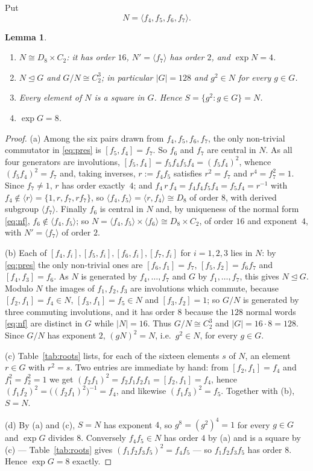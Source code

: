 \documentclass[11pt]{amsart}
\newtheorem{lemma}[theorem]{Lemma}
\theoremstyle{remark}
\begin{document}
Put
\[
 N=\langle f_4,f_5,f_6,f_7\rangle .
\]

\begin{lemma}\label{lem:structure}
\begin{enumerate}
\item[(a)] $N\cong D_8\times C_2$: it has order $16$, $N'=\langle f_7\rangle$ has order
      $2$, and $\exp N=4$.
\item[(b)] $N\trianglelefteq G$ and $G/N\cong C_2^3$; in particular $|G|=128$ and
      $g^2\in N$ for every $g\in G$.
\item[(c)] Every element of $N$ is a square in $G$. Hence $S=\{g^2:g\in G\}=N$.
\item[(d)] $\exp G=8$.
\end{enumerate}
\end{lemma}

\begin{proof}
(a) Among the six pairs drawn from $f_4,f_5,f_6,f_7$, the only non-trivial commutator in
\eqref{eq:pres} is $[f_5,f_4]=f_7$. So $f_6$ and $f_7$ are central in $N$. As all four
generators are involutions, $[f_5,f_4]=f_5f_4f_5f_4=(f_5f_4)^2$, whence $(f_5f_4)^2=f_7$
and, taking inverses, $r:=f_4f_5$ satisfies $r^2=f_7$ and $r^4=f_7^2=1$. Since $f_7\ne1$,
$r$ has order exactly~$4$; and $f_4\,r\,f_4=f_4f_4f_5f_4=f_5f_4=r^{-1}$ with $f_4\notin
\langle r\rangle=\{1,r,f_7,rf_7\}$, so $\langle f_4,f_5\rangle=\langle r,f_4\rangle\cong
D_8$ of order $8$, with derived subgroup $\langle f_7\rangle$. Finally $f_6$ is central in
$N$ and, by uniqueness of the normal form \eqref{eq:nf}, $f_6\notin\langle f_4,f_5\rangle$;
so $N=\langle f_4,f_5\rangle\times\langle f_6\rangle\cong D_8\times C_2$, of order $16$ and
exponent~$4$, with $N'=\langle f_7\rangle$ of order $2$.

(b) Each of $[f_4,f_i],[f_5,f_i],[f_6,f_i],[f_7,f_i]$ for $i=1,2,3$ lies in $N$: by
\eqref{eq:pres} the only non-trivial ones are $[f_6,f_1]=f_7$, $[f_5,f_2]=f_6f_7$ and
$[f_4,f_3]=f_6$. As $N$ is generated by $f_4,\dots,f_7$ and $G$ by $f_1,\dots,f_7$, this
gives $N\trianglelefteq G$. Modulo $N$ the images of $f_1,f_2,f_3$ are involutions which
commute, because $[f_2,f_1]=f_4\in N$, $[f_3,f_1]=f_5\in N$ and $[f_3,f_2]=1$; so $G/N$ is
generated by three commuting involutions, and it has order $8$ because the $128$ normal
words \eqref{eq:nf} are distinct in $G$ while $|N|=16$. Thus $G/N\cong C_2^3$ and
$|G|=16\cdot8=128$. Since $G/N$ has exponent $2$, $(gN)^2=N$, i.e.\ $g^2\in N$, for every
$g\in G$.

(c) Table~\ref{tab:roots} lists, for each of the sixteen elements $s$ of $N$, an element
$r\in G$ with $r^2=s$. Two entries are immediate by hand: from $[f_2,f_1]=f_4$ and
$f_1^2=f_2^2=1$ we get $(f_2f_1)^2=f_2f_1f_2f_1=[f_2,f_1]=f_4$, hence
$(f_1f_2)^2=\bigl((f_2f_1)^2\bigr)^{-1}=f_4$, and likewise $(f_1f_3)^2=f_5$. Together with
(b), $S=N$.

(d) By (a) and (c), $S=N$ has exponent $4$, so $g^8=(g^2)^4=1$ for every $g\in G$ and
$\exp G$ divides $8$. Conversely $f_4f_5\in N$ has order $4$ by (a) and is a square by (c)
--- Table~\ref{tab:roots} gives $(f_1f_2f_3f_5)^2=f_4f_5$ --- so $f_1f_2f_3f_5$ has order
$8$. Hence $\exp G=8$ exactly.
\end{proof}
\end{document}
